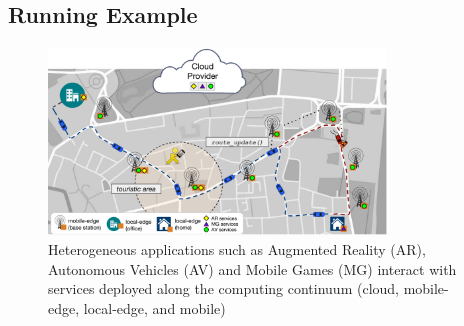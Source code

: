 


\subsection{Running Example}
\label{sub:example}

\begin{figure}[tbp]
	\includegraphics[width=0.8\textwidth]{figs/Continuum-Scenario}
	\caption{Heterogeneous applications such as Augmented Reality (AR), Autonomous Vehicles (AV) and Mobile Games (MG) interact with services deployed along the computing continuum (cloud, mobile-edge, local-edge, and mobile)}
	\label{fig:continuum-scenario}
\end{figure}


